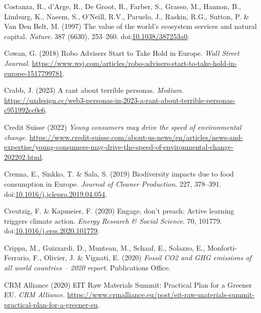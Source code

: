 \documentclass[
  letterpaper,
  DIV=11,
  numbers=noendperiod]{scrartcl}
\newlength{\cslhangindent}
\newenvironment{CSLReferences}[2] %
 {\begin{list}{}{%
  \setlength{\itemindent}{0pt}
  \setlength{\leftmargin}{0pt}
  \setlength{\parsep}{0pt}
  \ifodd #1
   \setlength{\leftmargin}{\cslhangindent}
   \setlength{\itemindent}{-1\cslhangindent}
  \fi
  \setlength{\itemsep}{#2\baselineskip}}}
 {\end{list}}
\begin{document}
\begin{CSLReferences}{0}{1}
Costanza, R., d'Arge, R., De Groot, R., Farber, S., Grasso, M., Hannon,
B., Limburg, K., Naeem, S., O'Neill, R.V., Paruelo, J., Raskin, R.G.,
Sutton, P. \& Van Den Belt, M. (1997) The value of the world's ecosystem
services and natural capital. \emph{Nature}. 387 (6630), 253--260.
doi:\href{https://doi.org/10.1038/387253a0}{10.1038/387253a0}.

Cowan, G. (2018) Robo {Advisers Start} to {Take Hold} in {Europe}.
\emph{Wall Street Journal}.
\url{https://www.wsj.com/articles/robo-advisers-start-to-take-hold-in-europe-1517799781}.

Crabb, J. (2023) A rant about terrible personas. \emph{Medium}.
\url{https://uxdesign.cc/web3-personas-in-2023-a-rant-about-terrible-personas-c951992cc0e6}.

Credit Suisse (2022) \emph{Young consumers may drive the speed of
environmental change}.
\url{https://www.credit-suisse.com/about-us-news/en/articles/news-and-expertise/young-consumers-may-drive-the-speed-of-environmental-change-202202.html}.

Crenna, E., Sinkko, T. \& Sala, S. (2019) Biodiversity impacts due to
food consumption in {Europe}. \emph{Journal of Cleaner Production}. 227,
378--391.
doi:\href{https://doi.org/10.1016/j.jclepro.2019.04.054}{10.1016/j.jclepro.2019.04.054}.

Creutzig, F. \& Kapmeier, F. (2020) Engage, don't preach: {Active}
learning triggers climate action. \emph{Energy Research \& Social
Science}. 70, 101779.
doi:\href{https://doi.org/10.1016/j.erss.2020.101779}{10.1016/j.erss.2020.101779}.

Crippa, M., Guizzardi, D., Muntean, M., Schaaf, E., Solazzo, E.,
Monforti-Ferrario, F., Olivier, J. \& Vignati, E. (2020) \emph{Fossil
{CO2} and {GHG} emissions of all world countries -- 2020 report}.
Publications Office.

CRM Alliance (2020) {EIT Raw Materials Summit}: {Practical Plan} for a
{Greener EU}. \emph{CRM Alliance}.
\url{https://www.crmalliance.eu/post/eit-raw-materials-summit-practical-plan-for-a-greener-eu}.


\end{CSLReferences}
\end{document}
